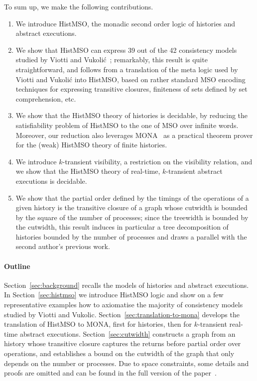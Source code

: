 To sum up, we make the following contributions.
\begin{enumerate}
    \item We introduce HistMSO, the monadic second order logic of histories and abstract executions.
    \item We show that HistMSO can express 39 out of the 42 consistency models studied by Viotti and Vukoli\'{c}~\cite{ViottiVukolic}; remarkably, this result is quite straightforward, and follows from a translation of the meta logic used by Viotti and Vukoli\'{c} into HistMSO, based on rather standard MSO encoding techniques for expressing transitive closures, finiteness of sets defined by set comprehension, etc. 
    \item We show that the HistMSO theory of histories is decidable, by reducing the satisfiability problem of HistMSO to the one of MSO over infinite words. Moreover, our reduction also leverages MONA~\cite{MONAguide} as a practical theorem prover for the (weak) HistMSO theory of finite histories.
    \item We introduce $k$-transient visibility, a restriction on the visibility relation, and we show that the HistMSO theory of real-time, $k$-transient abstract executions is decidable.
    \item We show that the partial order defined by the timings of the operations of a given history is the transitive closure of a graph whose cutwidth is bounded by the square of the number of processes; since the treewidth is bounded by the cutwidth, this result induces in particular a tree decomposition of histories bounded by the number of processes and draws a parallel with the second author's previous work.
\end{enumerate}

\paragraph{Outline} Section~\ref{sec:background} recalls the models of histories and abstract executions. In Section~\ref{sec:histmso} we introduce HistMSO logic and show on a few representative examples how to axiomatise the majority of consistency models studied by Viotti and Vukolic. Section~\ref{sec:translation-to-mona} develops the translation of HistMSO to MONA, first for histories, then for $k$-transient real-time abstract executions. Section~\ref{sec:cutwidth} constructs a graph from an history whose transitive closure captures the returns before partial order over operations, and establishes a bound on the cutwidth of the graph that only depends on the number or processes. 
\iflong\else
    Due to space constraints, some details and proofs are omitted and can be found in the full version of the paper~\cite{coget2026histmsologicreasoningconsistency}.
\fi

